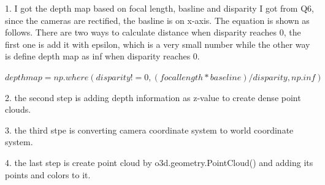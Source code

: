 \documentclass[11pt]{article}
\begin{document}
1. I got the depth map based on focal length, basline and disparity I got from Q6, since the cameras are rectified, the basline is on x-axis. The equation is shown as follows. There are two ways to calculate distance when disparity reaches 0, the first one is add it with epsilon, which is a very small number while the other way is define depth map as inf when disparity reaches 0.

$depth map = np.where(disparity != 0, (focallength * baseline) / disparity, np.inf)$

2. the second step is adding depth information as z-value to create dense point clouds.

3. the third stpe is converting camera coordinate system to world coordinate system.

4. the last step is create point cloud by o3d.geometry.PointCloud() and adding its points and colors to it.
\end{document}
